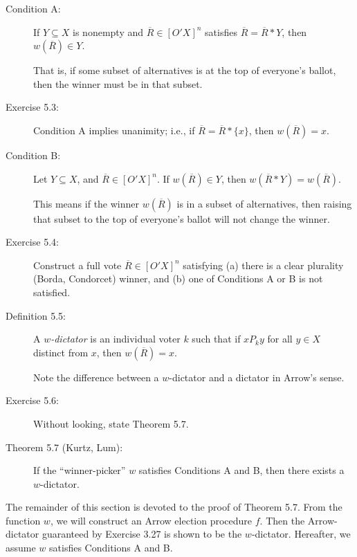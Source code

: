 \documentclass{article}
\begin{document}
\begin{description}

\item[Condition A:] If $Y \subseteq X$ is nonempty and $\overline{R} \in [O'X]^{n}$ satisfies $\overline{R} = \overline{R}*Y$, then $w(\overline{R}) \in Y$.

  That is, if some subset of alternatives is at the top of everyone's ballot, then the winner must be in that subset.

\item[Exercise 5.3:] Condition A implies unanimity; i.e., if $\overline{R} = \overline{R}* \{ x \}$, then $w(\overline{R}) = x$.

\item[Condition B:] Let $Y \subseteq X$, and $\overline{R} \in [O'X]^{n}$. If $w(\overline{R}) \in Y$, then $w(\overline{R}*Y) = w(\overline{R})$.

  This means if the winner $w(\overline{R})$ is in a subset of alternatives, then raising that subset to the top of everyone's ballot will not change the winner.

\item[Exercise 5.4:] Construct a full vote $\overline{R} \in [O'X]^{n}$ satisfying (a) there is a clear plurality (Borda, Condorcet) winner, and (b) one of Conditions A or B is not satisfied.

\item[Definition 5.5:] A \emph{$w$-dictator} is an individual voter $k$ such that if $xP_{k}y$ for all $y \in X$ distinct from $x$, then $w(\overline{R}) = x$.

  Note the difference between a $w$-dictator and a dictator in Arrow's sense.

\item[Exercise 5.6:] Without looking, state Theorem 5.7.

\item[Theorem 5.7 (Kurtz, Lum):] If the ``winner-picker'' $w$ satisfies Conditions A and B, then there exists a $w$-dictator.

\end{description}

The remainder of this section is devoted to the proof of Theorem 5.7. From the function $w$, we will construct an Arrow election procedure $f$. Then the Arrow-dictator guaranteed by Exercise 3.27 is shown to be the $w$-dictator. Hereafter, we assume $w$ satisfies Conditions A and B.
\end{document}
